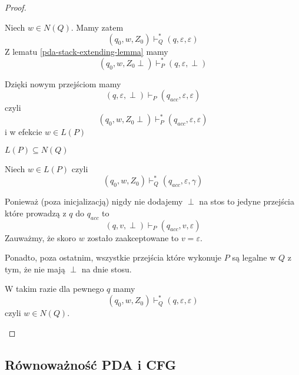 \begin{proof}
\begin{description}
\begin{description}
            Niech \( w \in N(Q) \). Mamy zatem 
            \[
                (q_0, w, Z_0) \vdash_Q^* (q, \varepsilon, \varepsilon)
            \]
            Z lematu \ref{pda-stack-extending-lemma} mamy 
            \[
                (q_0, w, Z_0\perp) \vdash_P^* (q, \varepsilon, \perp)
            \]
            
            Dzięki nowym przejściom mamy
            \[
                (q, \varepsilon, \perp) \vdash_P (q_{acc}, \varepsilon, \varepsilon)
            \]
            czyli
            \[
                (q_0, w, Z_0\perp) \vdash_P^* (q_{acc}, \varepsilon, \varepsilon)
            \]
            i w efekcie \( w \in L(P) \)
            
            
            \item \( L(P) \subseteq N(Q) \)
            
            Niech \( w \in L(P) \) czyli
             \[
                (q_0, w, Z_0) \vdash_Q^* (q_{acc}, \varepsilon, \gamma)
            \]
            
            Ponieważ (poza inicjalizacją) nigdy nie dodajemy \( \perp \) na stos to jedyne przejścia które prowadzą z \( q \) do \( q_{acc} \) to
            \[
                (q, v, \perp) \vdash_P (q_{acc}, v, \varepsilon)
            \]
            Zauważmy, że skoro \( w \) zostało zaakceptowane to \( v = \varepsilon \).
            
            Ponadto, poza ostatnim, wszystkie przejścia które wykonuje \( P \) są legalne w \( Q \) z tym, że nie mają \( \perp \) na dnie stosu.
            
            W takim razie dla pewnego \( q \) mamy
            \[
                (q_0, w, Z_0) \vdash_Q^* (q, \varepsilon, \varepsilon)
            \]
            czyli \( w \in N(Q) \).
            
        \end{description}
        
    \end{description}
\end{proof}

\subsection{Równoważność PDA i CFG}

